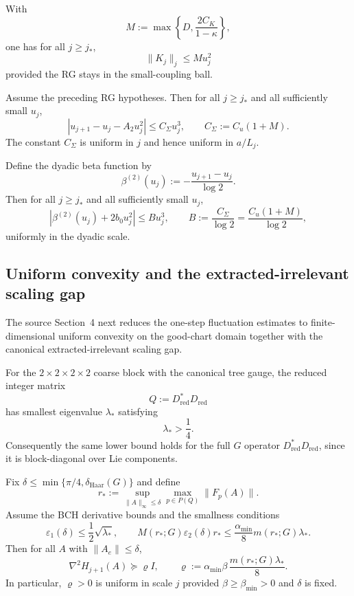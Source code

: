 \begin{corollary}
With
\[
M:=\max\!\left\{D,\frac{2C_K}{1-\kappa}\right\},
\]
one has for all $j\ge j_\ast$,
\[
\|K_j\|_j \le M u_j^2
\]
provided the RG stays in the small-coupling ball.
\end{corollary}

\begin{theorem}
Assume the preceding RG hypotheses. Then for all $j\ge j_\ast$ and all sufficiently small $u_j$,
\[
|u_{j+1}-u_j-A_2u_j^2|\le C_\Sigma u_j^3,
\qquad
C_\Sigma:=C_u(1+M).
\]
The constant $C_\Sigma$ is uniform in $j$ and hence uniform in $a/L_j$.
\end{theorem}

\begin{corollary}
Define the dyadic beta function by
\[
\beta^{(2)}(u_j):=-\frac{u_{j+1}-u_j}{\log 2}.
\]
Then for all $j\ge j_\ast$ and all sufficiently small $u_j$,
\[
|\beta^{(2)}(u_j)+2b_0u_j^2| \le Bu_j^3,
\qquad
B:=\frac{C_\Sigma}{\log 2}
= \frac{C_u(1+M)}{\log 2},
\]
uniformly in the dyadic scale.
\end{corollary}

\subsection{Uniform convexity and the extracted-irrelevant scaling gap}
The source Section~4 next reduces the one-step fluctuation estimates to finite-dimensional uniform convexity on the good-chart domain together with the canonical extracted-irrelevant scaling gap.

\begin{lemma}
For the $2\times 2\times 2\times 2$ coarse block with the canonical tree gauge, the reduced integer matrix
\[
Q:=D_{\mathrm{red}}^\ast D_{\mathrm{red}}
\]
has smallest eigenvalue $\lambda_\ast$ satisfying
\[
\lambda_\ast > \frac14.
\]
Consequently the same lower bound holds for the full $G$ operator $D_{\mathrm{red}}^\ast D_{\mathrm{red}}$, since it is block-diagonal over Lie components.
\end{lemma}

\begin{theorem}
Fix $\delta\le \min\{\pi/4,\delta_{\mathrm{Haar}}(G)\}$ and define
\[
r_\ast := \sup_{\|A\|_\infty\le \delta}\max_{p\in P(Q)} \|F_p(A)\|.
\]
Assume the BCH derivative bounds and the smallness conditions
\[
\varepsilon_1(\delta)\le \frac12\sqrt{\lambda_\ast},
\qquad
M(r_\ast;G)\varepsilon_2(\delta)r_\ast \le \frac{\alpha_{\min}}{8}m(r_\ast;G)\lambda_\ast.
\]
Then for all $A$ with $\|A_e\|\le \delta$,
\[
\nabla^2 H_{j+1}(A)\succeq \varrho I,
\qquad
\varrho := \alpha_{\min}\beta\,\frac{m(r_\ast;G)\lambda_\ast}{8}.
\]
In particular, $\varrho>0$ is uniform in scale $j$ provided $\beta\ge \beta_{\min}>0$ and $\delta$ is fixed.
\end{theorem}

